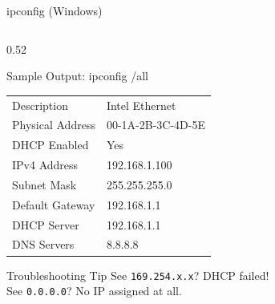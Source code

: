 \documentclass[aspectratio=169]{beamer}  %
\begin{document}
\begin{frame}{ipconfig (Windows)}
\begin{columns}[T]
\begin{column}{0.52\textwidth}
\begin{block}{Sample Output: ipconfig /all}
                \vspace{0.2em}
                \begin{tabular}{@{}l l@{}}
                   Description & Intel Ethernet \\
                   Physical Address & \textcolor{networkgreen}{00-1A-2B-3C-4D-5E} \\
                   DHCP Enabled & Yes \\
                   IPv4 Address & \textcolor{ipblue}{192.168.1.100} \\
                   Subnet Mask & \textcolor{ipblue}{255.255.255.0} \\
                   Default Gateway & \textcolor{ipblue}{192.168.1.1} \\
                   DHCP Server & 192.168.1.1 \\
                   DNS Servers & 8.8.8.8 \\
                \end{tabular}
            \end{block}
            
            \vspace{0.2em}
            \begin{alertblock}{Troubleshooting Tip}
                \small
                See \texttt{169.254.x.x}? DHCP failed! \\
                See \texttt{0.0.0.0}? No IP assigned at all.
            \end{alertblock}
        \end{column}
    \end{columns}
\end{frame}
\end{document}
